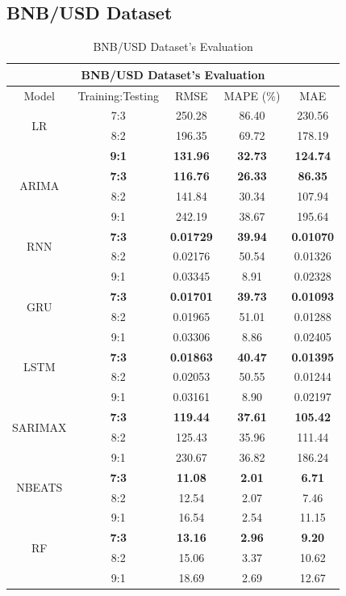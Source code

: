 \documentclass{ieeeojies}
\begin{document}
\subsection{BNB/USD Dataset}
\begin{table}[H]
	\centering
	\begin{tabular}{|c|c|c|c|c|}
		\hline
		\multicolumn{5}{|c|}{\textbf{BNB/USD Dataset's Evaluation}}\\
		\hline
		\centering Model & Training:Testing & RMSE & MAPE (\%) & MAE\\
		\hline
		\multirow{2}{*}{LR} & 7:3 & 250.28 &  86.40 &  230.56\\ & 8:2 & 196.35 & 69.72 & 178.19 \\ & \textbf{9:1} & \textbf{131.96} & \textbf{32.73} & \textbf{124.74}\\
		\hline
		\multirow{2}{*}{ARIMA} & \textbf{7:3} & \textbf{116.76} & \textbf{26.33} & \textbf{86.35} \\ & 8:2 & 141.84 & 30.34 & 107.94 \\ & 9:1 & 242.19 & 38.67 & 195.64\\
		\hline
		\multirow{2}{*}{RNN} & \textbf{7:3} & \textbf{0.01729} & \textbf{39.94} & \textbf{0.01070}\\ & 8:2& 0.02176 & 50.54 & 0.01326 \\ & 9:1 & 0.03345 & 8.91 & 0.02328\\
		\hline
		\multirow{2}{*}{GRU} & \textbf{7:3}	& \textbf{0.01701} & \textbf{39.73} &  \textbf{0.01093} \\ & 8:2 & 0.01965 & 51.01 & 0.01288 \\ & 9:1 & 0.03306  & 8.86 & 0.02405\\
		\hline
		\multirow{2}{*}{LSTM} & \textbf{7:3} &  \textbf{0.01863} &  \textbf{40.47} & \textbf{0.01395} \\ & 8:2 &  0.02053 & 50.55 &   0.01244 \\ & 9:1 &  0.03161  & 8.90 & 0.02197\\
		\hline
		\multirow{2}{*}{SARIMAX} & \textbf{7:3}	& \textbf{119.44} & \textbf{37.61} &  \textbf{105.42} \\ & 8:2 & 125.43 & 35.96 & 111.44 \\ & 9:1 & 230.67 &  36.82 & 186.24\\
		\hline
		\multirow{2}{*}{NBEATS} & \textbf{7:3} & \textbf{11.08} & \textbf{2.01} & \textbf{6.71} \\ & 8:2 & 12.54 & 2.07 & 7.46 \\ & 9:1 & 16.54	& 2.54 & 11.15 \\
		\hline
		\multirow{2}{*}{RF} & \textbf{7:3} & \textbf{13.16} & \textbf{2.96} & \textbf{9.20} \\ & 8:2 & 15.06 & 3.37 & 10.62 \\ & 9:1 & 18.69 & 2.69 & 12.67 \\
		\hline
	\end{tabular}
	\caption{BNB/USD Dataset's Evaluation}
	\label{ethresult}
\end{table}
\end{document}
